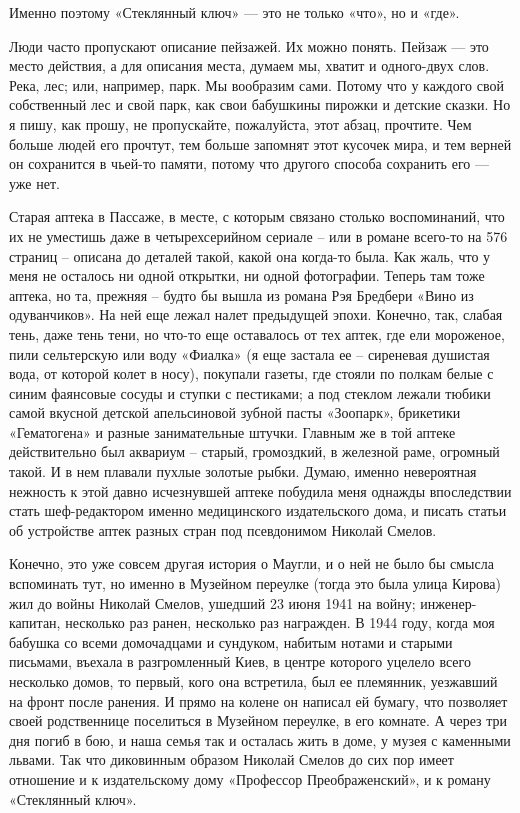 Именно поэтому «Стеклянный ключ» — это не только «что», но и «где».

Люди часто пропускают описание пейзажей. Их можно понять. Пейзаж — это место
действия, а для описания места, думаем мы, хватит и одного-двух слов. Река,
лес; или, например, парк. Мы вообразим сами. Потому что у каждого свой
собственный лес и свой парк, как свои бабушкины пирожки и детские сказки. Но я
пишу, как прошу, не пропускайте, пожалуйста, этот абзац, прочтите. Чем больше
людей его прочтут, тем больше запомнят этот кусочек мира, и тем верней он
сохранится в чьей-то памяти, потому что другого способа сохранить его — уже
нет.

Старая аптека в Пассаже, в месте, с которым связано столько воспоминаний, что
их не уместишь даже в четырехсерийном сериале – или в романе всего-то на 576
страниц – описана до деталей такой, какой она когда-то была. Как жаль, что у
меня не осталось ни одной открытки, ни одной фотографии. Теперь там тоже
аптека, но та, прежняя – будто бы вышла из романа Рэя Бредбери «Вино из
одуванчиков». На ней еще лежал налет предыдущей эпохи. Конечно, так, слабая
тень, даже тень тени, но что-то еще оставалось от тех аптек, где ели мороженое,
пили сельтерскую или воду «Фиалка» (я еще застала ее – сиреневая душистая вода,
от которой колет в носу), покупали газеты, где стояли по полкам белые с синим
фаянсовые сосуды и ступки с пестиками; а под стеклом лежали тюбики самой
вкусной детской апельсиновой зубной пасты «Зоопарк», брикетики «Гематогена» и
разные занимательные штучки. Главным же в той аптеке действительно был аквариум
– старый, громоздкий, в железной раме, огромный такой. И в нем плавали пухлые
золотые рыбки. Думаю, именно невероятная нежность к этой давно исчезнувшей
аптеке побудила меня однажды впоследствии стать шеф-редактором именно
медицинского издательского дома, и писать статьи об устройстве аптек разных
стран под псевдонимом Николай Смелов.

Конечно, это уже совсем другая история о Маугли, и о ней не было бы смысла
вспоминать тут, но именно в Музейном переулке (тогда это была улица Кирова) жил
до войны Николай Смелов, ушедший 23 июня 1941 на войну; инженер-капитан,
несколько раз ранен, несколько раз награжден. В 1944 году, когда моя бабушка со
всеми домочадцами и сундуком, набитым нотами и старыми письмами, въехала в
разгромленный Киев, в центре которого уцелело всего несколько домов, то первый,
кого она встретила, был ее племянник, уезжавший на фронт после ранения. И прямо
на колене он написал ей бумагу, что позволяет своей родственнице поселиться в
Музейном переулке, в его комнате. А через три дня погиб в бою, и наша семья так
и осталась жить в доме, у музея с каменными львами. Так что диковинным образом
Николай Смелов до сих пор имеет отношение и  к издательскому дому «Профессор
Преображенский», и к роману «Стеклянный ключ».

